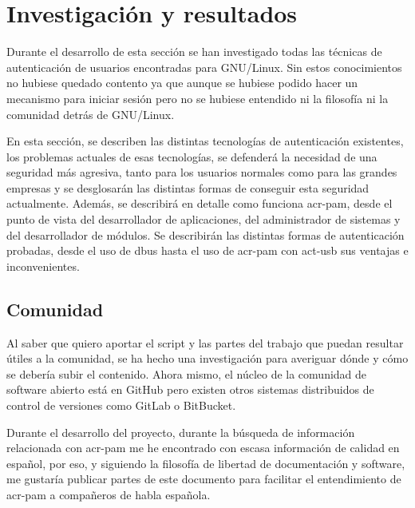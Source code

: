 \documentclass[twoside, titlepage, 12pt, a4paper]{article}
\let\oldsection\section
\def\section{\cleardoublepage\oldsection}
\begin{document}
\section{Investigación y resultados}
Durante el desarrollo de esta sección se han investigado todas las técnicas de autenticación de usuarios encontradas para \gls{GNU/Linux}. Sin estos conocimientos no hubiese quedado contento ya que aunque se hubiese podido hacer un mecanismo para iniciar sesión pero no se hubiese entendido ni la filosofía ni la comunidad detrás de \gls{GNU/Linux}. \par
En esta sección, se describen las distintas tecnologías de autenticación existentes, los problemas actuales de esas tecnologías, se defenderá la necesidad de una seguridad más agresiva, tanto para los usuarios normales como para las grandes empresas y se desglosarán las distintas formas de conseguir esta seguridad actualmente. Además, se describirá en detalle como funciona \gls{acr-pam}, desde el punto de vista del desarrollador de aplicaciones, del administrador de sistemas y del desarrollador de módulos. Se describirán las distintas formas de autenticación probadas, desde el uso de \gls{dbus} hasta el uso de \gls{acr-pam} con \gls{act-usb} sus ventajas e inconvenientes.
\subsection{Comunidad}
Al saber que quiero aportar el script y las partes del trabajo que puedan resultar útiles a la comunidad, se ha hecho una investigación para averiguar dónde y cómo se debería subir el contenido. Ahora mismo, el núcleo de la comunidad de software abierto está en \gls{GitHub} pero existen otros sistemas distribuidos de control de versiones como GitLab o BitBucket.\par
Durante el desarrollo del proyecto, durante la búsqueda de información relacionada con \gls{acr-pam} me he encontrado con escasa información de calidad en español, por eso, y siguiendo la filosofía de libertad de documentación y software, me gustaría publicar partes de este documento para facilitar el entendimiento de \gls{acr-pam} a compañeros de habla española.
\end{document}
